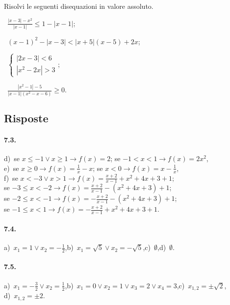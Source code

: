\begin{esercizio}[\Ast]
 \label{ese:7.36}
Risolvi le seguenti disequazioni in valore assoluto.
\begin{multicols}{2}
 \begin{enumeratea}
 \item~$\frac{\left|x-3\right|-x^2}{\left|x-1\right|}\le 1-\left|x-1\right|$;
 \item~$(x-1)^2-\left|x-3\right|<\left|x+5\right|(x-5)+2x$;
 \item~$\left\{\begin{array}{l}{\left|2x-3\right|<6}\\{\left|x^2-2x\right|>3}\end{array}\right.$;
 \item~$\frac{\left|x^2-1\right|-5}{\left|x-1\right|(x^2-x-6)}\ge 0$.
 \end{enumeratea}
 \end{multicols}
\end{esercizio}

\subsection{Risposte}
\paragraph{7.3.} d)~se $x\le -1\vee x\ge 1\to f(x)=2 $; se $-1<x<1 \to f(x)=2x^2$,\protect\\
\quad e)~se $x\ge 0 \to f(x)=\frac 1 x-x$; se $x<0 \to f(x)=x-\frac 1 x$,\protect\\
\quad f)~se $x<-3\vee x>1 \to f(x)=\frac{x+2}{x-1}+x^2+4x+3+1$;\protect\\ se $-3\le x<-2 \to f(x)=\frac{x+2}{x-1}-(x^2+4x+3)+1$;\protect\\ se $-2\le x<-1\to f(x)=-\frac{x+2}{x-1}-(x^2+4x+3)+1$;\protect\\ se $-1\le x<1\to f(x)=-\frac{x+2}{x-1}+x^2+4x+3+1$.

\paragraph{7.4.} a)~$x_1=1\vee x_2=-\frac 1 2$,\quad b)~$x_1=\sqrt 5\vee x_2=-\sqrt 5$,\quad c)~$\emptyset $,\quad d)~$\emptyset $.

\paragraph{7.5.} a)~$x_1=-\frac 3 2\vee x_2=\frac 1 2$,\quad b)~$x_1=0\vee x_2=1\vee x_3=2\vee x_4=3$,\quad c)~$x_{1,2}=\pm \sqrt 2$,\protect\\
\quad d)~$x_{1,2}=\pm 2$.

